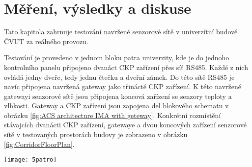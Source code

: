 \chapter{Měření, výsledky a diskuse}
Tato kapitola zahrnuje testování navržené senzorové sítě v univerzítní budově ČVUT za reálného provozu.

Testování je provedeno v jednom bloku patra univerzity, kde je do jednoho kontrolního panelu připojeno dvanáct CKP zařízení přes síť RS485. Každé z nich ovládá jedny dveře, tedy jednu čtečku a dveřní zámek.
Do této sítě RS485 je navíc připojena navržená gateway jako třinácté CKP zařízení.
K této navržené gatewayi senzorové sítě jsou připojena koncová zařízení se senzory teploty a vlhkosti.
Gateway a CKP zařízení jsou zapojena del blokového schematu v obrázku \ref{fig:ACS architecture IMA with geteway}.
Konkrétní rozmístění stávajcích dvanácti CKP zařízení, gatewaye a dvou koncových zařízení senzorové sítě v testovaných prostorách budovy je zobrazeno v obrázku \ref{fig:CorridorFloorPlan}.

\begin{figure*}[!ht]
    \centering
    \texttt{[image: 5patro]}
    \caption{Rozmístění koncových zařízení sítě a zařízení CKP v testovaných prostorách budovy}
    \label{fig:CorridorFloorPlan}
\end{figure*}



